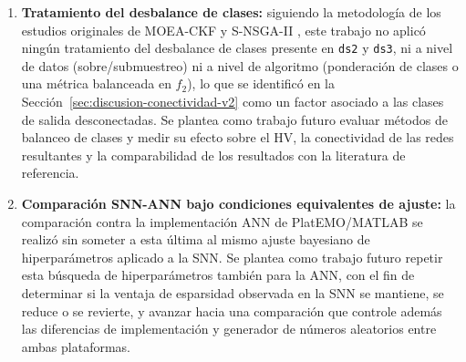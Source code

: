 \begin{enumerate}
    \item \textbf{Tratamiento del desbalance de clases:} siguiendo la metodología de los estudios originales de MOEA-CKF y S-NSGA-II \cite{MOEA/CKF, 10066873_S-NSGA-II}, este trabajo no aplicó ningún tratamiento del desbalance de clases presente en \texttt{ds2} y \texttt{ds3}, ni a nivel de datos (sobre/submuestreo) ni a nivel de algoritmo (ponderación de clases o una métrica balanceada en $f_2$), lo que se identificó en la Sección~\ref{sec:discusion-conectividad-v2} como un factor asociado a las clases de salida desconectadas. Se plantea como trabajo futuro evaluar métodos de balanceo de clases y medir su efecto sobre el HV, la conectividad de las redes resultantes y la comparabilidad de los resultados con la literatura de referencia.

    \item \textbf{Comparación SNN-ANN bajo condiciones equivalentes de ajuste:} la comparación contra la implementación ANN de PlatEMO/MATLAB se realizó sin someter a esta última al mismo ajuste bayesiano de hiperparámetros aplicado a la SNN. Se plantea como trabajo futuro repetir esta búsqueda de hiperparámetros también para la ANN, con el fin de determinar si la ventaja de esparsidad observada en la SNN se mantiene, se reduce o se revierte, y avanzar hacia una comparación que controle además las diferencias de implementación y generador de números aleatorios entre ambas plataformas.
\end{enumerate}
